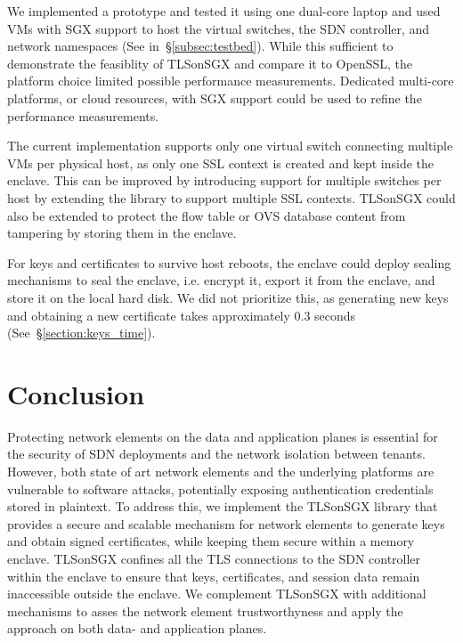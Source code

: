 {We implemented a prototype and tested it using one dual-core laptop and used VMs with SGX support to host the virtual switches, the SDN controller, and network namespaces (See in~\S\ref{subsec:testbed}). 
While this sufficient to demonstrate the feasiblity of TLSonSGX and compare it to OpenSSL, the platform choice 
limited possible performance measurements.
Dedicated multi-core platforms, or cloud resources, with SGX support could be used to refine the performance measurements.

The current implementation supports only one virtual switch connecting multiple VMs per physical host, as only one SSL context is created and kept inside the enclave. 
This can be improved by introducing support for multiple switches per host by extending the library to support multiple SSL contexts. 
TLSonSGX could also be extended to protect the flow table %
or OVS database content %
from tampering by storing them in the enclave. 

For keys and certificates to survive host reboots, the enclave could deploy sealing mechanisms to seal the enclave, i.e. encrypt it, export it from the enclave, and store it on the local hard disk. 
We did not prioritize this, as generating new keys and obtaining a new certificate takes approximately 0.3 seconds (See~\S\ref{section:keys_time}).



\section{Conclusion}
\label{sec:trustanchors:conclusion}
Protecting network elements on the data and application planes is essential for the security of SDN deployments and the network isolation between tenants.
However, both state of art network elements and the underlying platforms are vulnerable to software attacks, potentially exposing authentication credentials stored in plaintext.
To address this, we implement the TLSonSGX library that provides a secure and scalable mechanism for network elements to generate keys and obtain signed certificates, while keeping them secure within a memory enclave.
TLSonSGX confines all the TLS connections to the SDN controller within the enclave to ensure that keys, certificates, and session data remain inaccessible outside the enclave.
We complement TLSonSGX with additional mechanisms to asses the network element trustworthyness and apply the approach on both data- and application planes.

}

